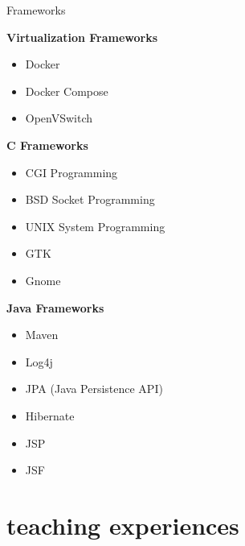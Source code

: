 \documentclass[]{friggeri-cv} %
\begin{document}
\begin{entrylist}
  \entry{\textcolor{UniBlue}{$\bullet$}}
  {Frameworks}
  {}
  {
    \textbf{Virtualization Frameworks}
    \begin{itemize}
      \item Docker
      \item Docker Compose
      \item OpenVSwitch
    \end{itemize}
    \textbf{C Frameworks}
    \begin{itemize}
      \item CGI Programming
      \item BSD Socket Programming
      \item UNIX System Programming
      \item GTK
      \item Gnome
    \end{itemize}
    \textbf{Java Frameworks}
    \begin{itemize}
      \item Maven
      \item Log4j
      \item JPA (Java Persistence API)
      \item Hibernate
      \item JSP
      \item JSF
    \end{itemize}
  }



\end{entrylist}
\pagebreak


\section{teaching experiences}
\end{document}
